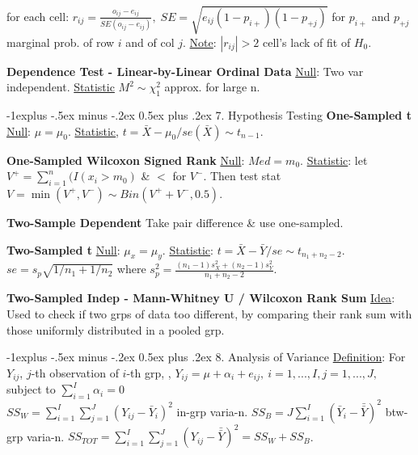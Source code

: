 \documentclass[10pt,landscape,letterpaper]{article}
\makeatletter
\renewcommand{\subsection}{\@startsection{subsection}{2}{0mm}%
                                {-1explus -.5ex minus -.2ex}%
                                {0.5ex plus .2ex}%
                                {\sffamily\normalsize\itshape}}
\makeatother
\begin{document}
\begin{multicols}{3}
 for each cell:
$r_{ij} = \frac{o_{ij} - e_{ij}}{SE(o_{ij} - e_{ij})}, 
\; 
SE = \sqrt{ e_{ij} (1 - p_{i+}) (1 - p_{+j}) }
$ for $p_{i+}$ and $p_{+j}$ marginal prob. of row $i$ and of col $j$. 
\underline{Note}: $|r_{ij}| > 2$ cell's lack of fit of $H_0$.


\textbf{Dependence Test - Linear-by-Linear Ordinal Data}
\underline{Null}: Two var independent. \underline{Statistic} $M^2 \sim \chi^2_1$ approx. for large n.





\subsection{7. Hypothesis Testing}
\textbf{One-Sampled t}
\underline{Null}: $\mu = \mu_0$. 
\underline{Statistic}, $t = {\bar{X} - \mu_0} / se(\bar{X}) \sim t_{n-1}$.


\textbf{One-Sampled Wilcoxon Signed Rank}
\underline{Null}: $Med = m_0$.
\underline{Statistic}: let $V^{+} = \sum_{i=1}^n(I(x_i > m_0)$ \& $<$ for $V^{-}$. Then test stat $V = \min(V^+, V^-) \sim Bin(V^{+} + V^{-}, 0.5)$.


\textbf{Two-Sample Dependent} 
Take pair difference \& use one-sampled.


\textbf{Two-Sampled t}
\underline{Null}: $\mu_x = \mu_y$.
\underline{Statistic}:  $t = {\bar{X} - \bar{Y}} / se \sim t_{n_1+n_2-2}$. $se = s_p \sqrt{1/n_1 + 1/n_2}$ where $s^2_p = \frac{(n_1-1)s^2_X + (n_2-1)s^2_Y}{n_1+n_2-2}$.


\textbf{Two-Sampled Indep - Mann-Whitney U / Wilcoxon Rank Sum}
\underline{Idea}: Used to check if two grps of data too different, by comparing their rank sum with those uniformly distributed in a pooled grp.





\subsection{8. Analysis of Variance}
\underline{Definition}: For $Y_{ij}$, $j$-th observation of $i$-th grp, ,
$ %
Y_{ij} = \mu + \alpha_i + e_{ij}, \ i = 1, ..., I, j = 1, ..., J,$ subject to $\sum_{i=1}^I \alpha_i = 0$
\\
$SS_W = \sum_{i=1}^I\sum_{j=1}^J (Y_{ij} - \bar{Y}_i)^2$ in-grp varia-n. $SS_B = J \sum_{i=1}^I (\bar{Y}_i - \bar{\bar{Y}})^2$ btw-grp varia-n. $SS_{TOT} = \sum_{i=1}^I\sum_{j=1}^J (Y_{ij} - \bar{\bar{Y}})^2 = SS_W + SS_B$.
\\


\end{multicols}
\end{document}
